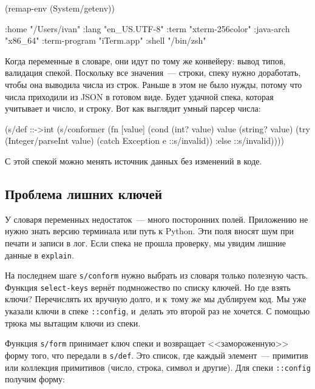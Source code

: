 \begin{english}
  \begin{clojure}
(remap-env (System/getenv))

{:home "/Users/ivan"
 :lang "en_US.UTF-8"
 :term "xterm-256color"
 :java-arch "x86_64"
 :term-program "iTerm.app"
 :shell "/bin/zsh"}
  \end{clojure}
\end{english}

Когда переменные в словаре, они идут по тому же конвейеру: вывод типов,
валидация спекой. Поскольку все значения~--- строки, спеку нужно доработать, чтобы
она выводила числа из строк. Раньше в этом не было нужды, потому что числа
приходили из JSON в готовом виде. Будет удачной спека, которая учитывает и
число, и строку. Вот как выглядит умный парсер числа:

\begin{english}
  \begin{clojure}
(s/def ::->int
  (s/conformer
   (fn [value]
     (cond
       (int? value) value
       (string? value)
       (try (Integer/parseInt value)
            (catch Exception e
              ::s/invalid))
       :else ::s/invalid))))
  \end{clojure}
\end{english}

\noindent
С этой спекой можно менять источник данных без изменений в коде.

\subsection{Проблема лишних ключей}

У словаря переменных недостаток~--- много посторонних полей. Приложению не нужно
знать версию терминала или путь к Python. Эти поля вносят шум при печати и
записи в лог. Если спека не прошла проверку, мы увидим лишние данные в
\verb|explain|.


На последнем шаге \verb|s/conform| нужно выбрать из словаря только полезную
часть. Функция \verb|select-keys| вернёт подмножество по списку ключей. Но где
взять ключи? Перечислять их вручную долго, и к~тому же мы дублируем код. Мы уже
указали ключи в спеке \verb|::config|, и~делать это второй раз не хочется. С
помощью трюка мы вытащим ключи из спеки.

Функция \verb|s/form| принимает ключ спеки и возвращает <<замороженную>> форму
того, что передали в \verb|s/def|. Это список, где каждый элемент~--- примитив или
коллекция примитивов (число, строка, символ и другие). Для спеки \verb|::config|
получим форму:

